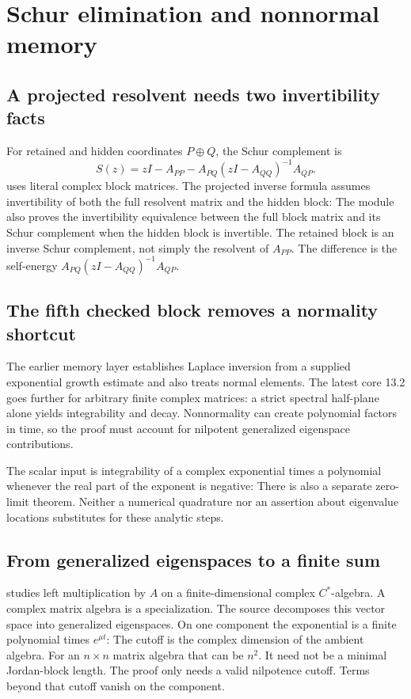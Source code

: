 \clearpage\section{Schur elimination and nonnormal memory}
\label{sec:memory}
\subsection{A projected resolvent needs two invertibility facts}
For retained and hidden coordinates $P\oplus Q$, the Schur complement is
\[
S(z)=zI-A_{PP}-A_{PQ}(zI-A_{QQ})^{-1}A_{QP}.
\]
 uses literal complex block matrices. The projected inverse formula assumes invertibility of both the full resolvent matrix and the hidden block:
The module also proves the invertibility equivalence between the full block matrix and its Schur complement when the hidden block is invertible. The retained block is an inverse Schur complement, not simply the resolvent of $A_{PP}$. The difference is the self-energy $A_{PQ}(zI-A_{QQ})^{-1}A_{QP}$.

\subsection{The fifth checked block removes a normality shortcut}
The earlier memory layer establishes Laplace inversion from a supplied exponential growth estimate and also treats normal elements. The latest core 13.2 goes further for arbitrary finite complex matrices: a strict spectral half-plane alone yields integrability and decay. Nonnormality can create polynomial factors in time, so the proof must account for nilpotent generalized eigenspace contributions.

The scalar input is integrability of a complex exponential times a polynomial whenever the real part of the exponent is negative:
There is also a separate zero-limit theorem. Neither a numerical quadrature nor an assertion about eigenvalue locations substitutes for these analytic steps.

\subsection{From generalized eigenspaces to a finite sum}
 studies left multiplication by $A$ on a finite-dimensional complex $C^*$-algebra. A complex matrix algebra is a specialization. The source decomposes this vector space into generalized eigenspaces. On one component the exponential is a finite polynomial times $e^{\mu t}$:
The cutoff is the complex dimension of the ambient algebra. For an $n\times n$ matrix algebra that can be $n^2$. It need not be a minimal Jordan-block length. The proof only needs a valid nilpotence cutoff. Terms beyond that cutoff vanish on the component.

